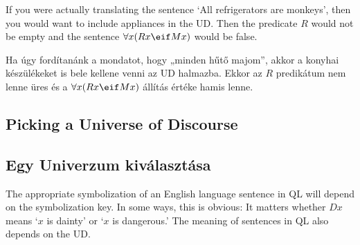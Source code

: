 If you were actually translating the sentence `All refrigerators are monkeys', then you would want to include appliances in the UD. Then the predicate $R$ would not be empty and the sentence $\forall x(Rx \eif Mx)$ would be false.

Ha úgy fordítanánk a mondatot, hogy „minden hűtő majom”, akkor a konyhai készülékeket is bele kellene venni az UD halmazba. Ekkor az $R$ predikátum nem lenne üres és a $\forall x(Rx \eif Mx)$ állítás értéke hamis lenne.

\begin{table}[h!]
\end{table}

\begin{table}[h!]
\end{table}

\subsection*{Picking a Universe of Discourse}
\subsection{Egy Univerzum kiválasztása}
The appropriate symbolization of an English language sentence in QL will depend on the symbolization key. In some ways, this is obvious: It matters whether $Dx$ means `$x$ is dainty' or `$x$ is dangerous.' The meaning of sentences in QL also depends on the UD.

